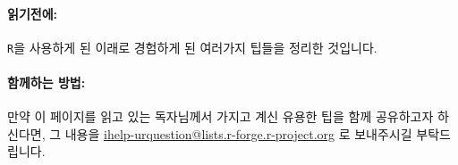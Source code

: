 \paragraph{읽기전에:}
\texttt{R}을 사용하게 된 이래로 경험하게 된 여러가지 팁들을 정리한 것입니다.


% 

\paragraph{함께하는 방법:}
만약 이 페이지를 읽고 있는 독자님께서 가지고 계신 유용한 팁을 함께 공유하고자 하신다면, 그 내용을 \href{mailto:ihelp-urquestion@lists.r-forge.r-project.org}{ihelp-urquestion@lists.r-forge.r-project.org} 로 보내주시길 부탁드립니다.

%
%

